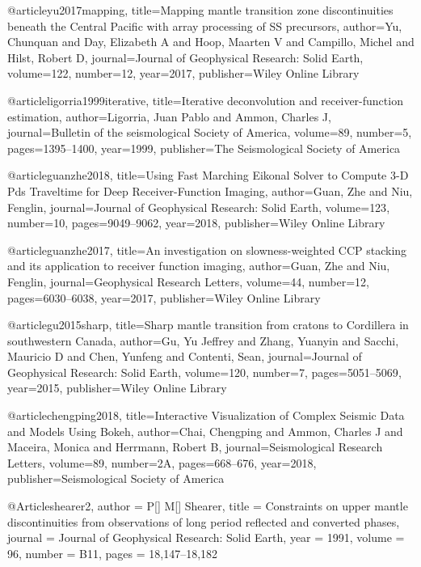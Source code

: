@article{yu2017mapping,
  title={Mapping mantle transition zone discontinuities beneath the Central Pacific with array processing of SS precursors},
  author={Yu, Chunquan and Day, Elizabeth A and Hoop, Maarten V and Campillo, Michel and Hilst, Robert D},
  journal={Journal of Geophysical Research: Solid Earth},
  volume={122},
  number={12},
  year={2017},
  publisher={Wiley Online Library}
}

@article{ligorria1999iterative,
  title={Iterative deconvolution and receiver-function estimation},
  author={Ligorria, Juan Pablo and Ammon, Charles J},
  journal={Bulletin of the seismological Society of America},
  volume={89},
  number={5},
  pages={1395--1400},
  year={1999},
  publisher={The Seismological Society of America}
}

@article{guanzhe2018,
  title={Using Fast Marching Eikonal Solver to Compute 3-D Pds Traveltime for Deep Receiver-Function Imaging},
  author={Guan, Zhe and Niu, Fenglin},
  journal={Journal of Geophysical Research: Solid Earth},
  volume={123},
  number={10},
  pages={9049--9062},
  year={2018},
  publisher={Wiley Online Library}
}

@article{guanzhe2017,
  title={An investigation on slowness-weighted CCP stacking and its application to receiver function imaging},
  author={Guan, Zhe and Niu, Fenglin},
  journal={Geophysical Research Letters},
  volume={44},
  number={12},
  pages={6030--6038},
  year={2017},
  publisher={Wiley Online Library}
}

@article{gu2015sharp,
  title={Sharp mantle transition from cratons to Cordillera in southwestern Canada},
  author={Gu, Yu Jeffrey and Zhang, Yuanyin and Sacchi, Mauricio D and Chen, Yunfeng and Contenti, Sean},
  journal={Journal of Geophysical Research: Solid Earth},
  volume={120},
  number={7},
  pages={5051--5069},
  year={2015},
  publisher={Wiley Online Library}
}

@article{chengping2018,
  title={Interactive Visualization of Complex Seismic Data and Models Using Bokeh},
  author={Chai, Chengping and Ammon, Charles J and Maceira, Monica and Herrmann, Robert B},
  journal={Seismological Research Letters},
  volume={89},
  number={2A},
  pages={668--676},
  year={2018},
  publisher={Seismological Society of America}
}



@Article{shearer2,
  author = 	 {P[] M[] Shearer},
  title = 	 {Constraints on upper mantle discontinuities from observations
	of long period reflected and converted phases},
  journal = 	 {Journal of Geophysical Research: Solid Earth},
  year = 	 1991,
  volume = 	 96,
  number = 	 {B11},
  pages = 	 {18,147--18,182}}
  
